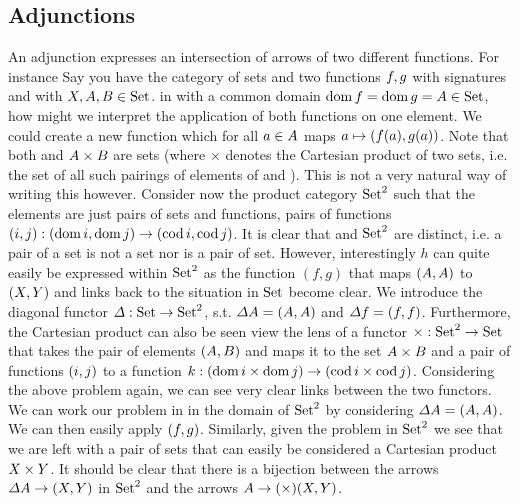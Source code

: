 \subsection{Adjunctions}
An adjunction expresses an intersection of arrows of two different functions. For instance Say you have the category  of sets \cite{RelationalAlgebraByWayOfAdjunctions} and two functions $\mathnormal{f}, \mathnormal{g}$ with signatures  and  with $\mathnormal{X}, \mathnormal{A}, \mathnormal{B} \in \mathrm{Set}$.
in  with a common domain $\mathrm{dom}\,\mathnormal{f} = \mathrm{dom}\,\mathnormal{g} = \mathnormal{A}
\in \mathrm{Set}$, how might we interpret the application of both
functions on one element. We could create a new function  which for all $a \in \mathnormal{A}$ maps $a \mapsto (\mathnormal{f}(a),
\mathnormal{g}(a))$. Note that both  and $\mathnormal{A} \times \mathnormal{B}$ are sets
(where $\times$ denotes the Cartesian product of two sets, i.e. the set of all
such pairings of elements of  and ). This is not a very natural
way of writing this however. Consider now the product category
$\mathrm{Set}^2$ such that the elements are just pairs of sets and
functions, pairs of functions $(\mathnormal{i}, \mathnormal{j}): (\mathrm{dom}\,\mathnormal{i}, \mathrm{dom}\,\mathnormal{j})
\to (\mathrm{cod}\,\mathnormal{i}, \mathrm{cod}\,\mathnormal{j})$. It is clear that  and
$\mathrm{Set}^2$ are distinct, i.e. a pair of a set is not a set nor is a
pair of set. However, interestingly $h$ can quite easily be expressed within
$\mathrm{Set}^2$ as the function $(f, g)$ that maps $(\mathnormal{A}, \mathnormal{A})$
to $(\mathnormal{X}, \mathnormal{Y})$ and links back to the situation in $\mathrm{Set}$
become clear. We introduce the diagonal functor $\mathnormal{\Delta}:
\mathrm{Set} \to \mathrm{Set}^2$, s.t. $\mathnormal{\Delta} \mathnormal{A} =
(\mathnormal{A}, \mathnormal{A})$ and $\mathnormal{\Delta} \mathnormal{f} = (\mathnormal{f}, \mathnormal{f})$.
Furthermore, the Cartesian product can also be seen view the lens of a functor $\mathnormal{\times}: \mathrm{Set}^2 \to \mathrm{Set}$ that takes the pair of elements $(\mathnormal{A}, \mathnormal{B})$ and maps it to the set $\mathnormal{A} \times \mathnormal{B}$ and a pair of functions $(\mathnormal{i}, \mathnormal{j})$ to a function $k: \left(\mathrm{dom}\,\mathnormal{i} \times \mathrm{dom}\,\mathnormal{j}\right) \to \left(\mathrm{cod}\,\mathnormal{i} \times \mathrm{cod}\,\mathnormal{j}\right)$.
Considering the above problem again, we can see very clear links between the two
functors. We can work our problem in  in the domain of
$\mathrm{Set}^2$ by considering $\mathnormal{\Delta} \mathnormal{A} = (\mathnormal{A},
\mathnormal{A})$. We can then easily apply $(\mathnormal{f}, \mathnormal{g})$. Similarly, given
the problem in $\mathrm{Set}^2$ we see that we are left with a pair of
sets that can easily be considered a Cartesian product $\mathnormal{X} \times \mathnormal{Y}$. It should be clear that there is a bijection between the arrows $\mathnormal{\Delta} \mathnormal{A} \to (\mathnormal{X}, \mathnormal{Y})$ in $\mathrm{Set}^2$ and the arrows $\mathnormal{A} \to \mathnormal{(\times)} \mathnormal{(X, Y)}$.


